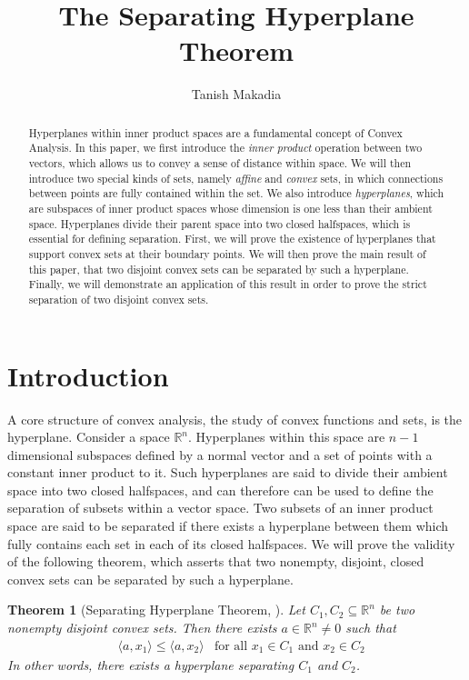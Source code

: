 \documentclass[11pt,reqno]{amsart}
\title{The Separating Hyperplane Theorem}
\author{Tanish Makadia}
\newcommand{\R}{\mathbb{R}}
\theoremstyle{plain}
\newtheorem{maintheorem}{Theorem}
\theoremstyle{definition}
\begin{document}
\maketitle


\begin{abstract}
    Hyperplanes within inner product spaces are a fundamental concept of Convex Analysis. In this paper, we first introduce the \emph{inner product} operation between two vectors, which allows us to convey a sense of distance within space. We will then introduce two special kinds of sets, namely \emph{affine} and \emph{convex} sets, in which connections between points are fully contained within the set. We also introduce \emph{hyperplanes}, which are subspaces of inner product spaces whose dimension is one less than their ambient space. Hyperplanes divide their parent space into two closed halfspaces, which is essential for defining separation. First, we will prove the existence of hyperplanes that support convex sets at their boundary points. We will then prove the main result of this paper, that two disjoint convex sets can be separated by such a hyperplane. Finally, we will demonstrate an application of this result in order to prove the strict separation of two disjoint convex sets.
\end{abstract}


\section{Introduction}
\label{sec:introduction}
A core structure of convex analysis, the study of convex functions and sets, is the hyperplane. Consider a space $\R^n$. Hyperplanes within this space are $n-1$ dimensional subspaces defined by a normal vector and a set of points with a constant inner product to it. Such hyperplanes are said to divide their ambient space into two closed halfspaces, and can therefore can be used to define the separation of subsets within a vector space. Two subsets of an inner product space are said to be separated if there exists a hyperplane between them which fully contains each set in each of its closed halfspaces. We will prove the validity of the following theorem, which asserts that two nonempty, disjoint, closed convex sets can be separated by such a hyperplane.\cite{boyd_vandenberghe_2004}

\begin{maintheorem}[{Separating Hyperplane Theorem, \cite[1.5.2]{bertsekas2009convex}}]
\label{thm:main}
Let $C_1, C_2 \subseteq\R^n$ be two nonempty disjoint convex sets. Then there exists $a\in\R^n\neq 0$ such that 
   \begin{align*}
    &\langle a,x_1\rangle \leq \langle a,x_2\rangle &\text{for all $x_1 \in C_1$ and $x_2 \in C_2$}
   \end{align*}
   In other words, there exists a hyperplane separating $C_1$ and $C_2$.
\end{maintheorem}
\end{document}
